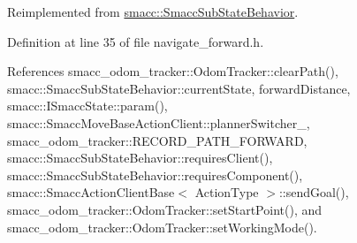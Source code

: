 Reimplemented from \hyperlink{classsmacc_1_1SmaccSubStateBehavior_a7c28e1c46238bbb2c2e0450573c6de94}{smacc\+::\+Smacc\+Sub\+State\+Behavior}.



Definition at line 35 of file navigate\+\_\+forward.\+h.



References smacc\+\_\+odom\+\_\+tracker\+::\+Odom\+Tracker\+::clear\+Path(), smacc\+::\+Smacc\+Sub\+State\+Behavior\+::current\+State, forward\+Distance, smacc\+::\+I\+Smacc\+State\+::param(), smacc\+::\+Smacc\+Move\+Base\+Action\+Client\+::planner\+Switcher\+\_\+, smacc\+\_\+odom\+\_\+tracker\+::\+R\+E\+C\+O\+R\+D\+\_\+\+P\+A\+T\+H\+\_\+\+F\+O\+R\+W\+A\+RD, smacc\+::\+Smacc\+Sub\+State\+Behavior\+::requires\+Client(), smacc\+::\+Smacc\+Sub\+State\+Behavior\+::requires\+Component(), smacc\+::\+Smacc\+Action\+Client\+Base$<$ Action\+Type $>$\+::send\+Goal(), smacc\+\_\+odom\+\_\+tracker\+::\+Odom\+Tracker\+::set\+Start\+Point(), and smacc\+\_\+odom\+\_\+tracker\+::\+Odom\+Tracker\+::set\+Working\+Mode().


